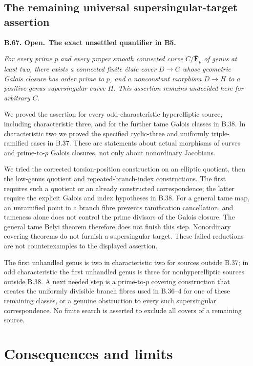\documentclass[11pt,a4paper]{article}
\newenvironment{claim}[3]{\par\medskip\noindent\hypertarget{#1}{\textbf{#1. #2.}}\ \textbf{#3.}\par\nopagebreak\smallskip\begingroup\itshape}{\endgroup\par\smallskip}
\begin{document}
\subsection{The remaining universal supersingular-target assertion}

\begin{claim}{B.67}{Open}{The exact unsettled quantifier in B5}
For every prime $p$ and every proper smooth connected curve
$C/\overline{\mathbf F}_p$ of genus at least two, there exists
a connected finite \emph{\'etale} cover $D\to C$ whose geometric
Galois closure has order prime to $p$, and a nonconstant morphism
$D\to H$ to a positive-genus supersingular curve $H$.
This assertion remains undecided here for arbitrary $C$.
\end{claim}

We proved the assertion for every odd-characteristic hyperelliptic
source, including characteristic three, and for the further tame
Galois classes in B.38. In characteristic two we proved the
specified cyclic-three and uniformly triple-ramified cases in
B.37. These are statements about actual morphisms of curves and
prime-to-$p$ Galois closures, not only about nonordinary Jacobians.

We tried the corrected torsion-position construction on an elliptic
quotient, then the low-genus quotient and repeated-branch-index
constructions. The first requires such a quotient or an already
constructed correspondence; the latter require the explicit
Galois and index hypotheses in B.38. For a general tame map,
an unramified point in a branch fibre prevents ramification
cancellation, and tameness alone does not control the prime
divisors of the Galois closure. The general tame Belyi theorem
therefore does not finish this step. Nonordinary covering theorems
do not furnish a supersingular target. These failed reductions
are not counterexamples to the displayed assertion.

The first unhandled genus is two in characteristic two for sources
outside B.37; in odd characteristic the first unhandled genus is
three for nonhyperelliptic sources outside B.38. A next needed
step is a prime-to-$p$ covering construction that creates the
uniformly divisible branch fibres used in B.36--4 for one of
these remaining classes, or a genuine obstruction to every such
supersingular correspondence. No finite search is asserted to
exclude all covers of a remaining source.


\section{Consequences and limits}
\end{document}
